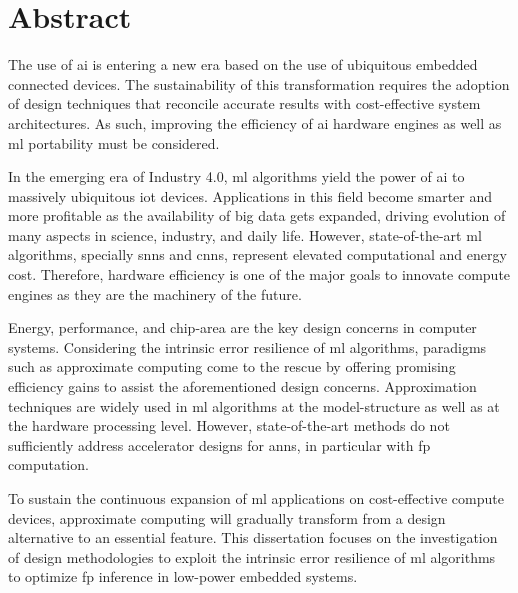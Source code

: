 \chapter*{Abstract}
\thispagestyle{empty}
The use of \gls{ai} is entering a new era based on the use of ubiquitous embedded connected devices. The sustainability of this transformation requires the adoption of design techniques that reconcile accurate results with cost-effective system architectures. As such, improving the efficiency of \gls{ai} hardware engines as well as \gls{ml} portability must be considered.

In the emerging era of Industry 4.0, \gls{ml} algorithms yield the power of \gls{ai} to massively ubiquitous \gls{iot} devices. Applications in this field become smarter and more profitable as the availability of big data gets expanded, driving evolution of many aspects in science, industry, and daily life. However, state-of-the-art \gls{ml} algorithms, specially \glspl{snn} and \glspl{cnn}, represent elevated computational and energy cost. Therefore, hardware efficiency is one of the major goals to innovate compute engines as they are the machinery of the future.

Energy, performance, and chip-area are the key design concerns in computer systems. Considering the intrinsic error resilience of \gls{ml} algorithms, paradigms such as approximate computing come to the rescue by offering promising efficiency gains to assist the aforementioned design concerns. Approximation techniques are widely used in \gls{ml} algorithms at the model-structure as well as at the hardware processing level. However, state-of-the-art methods do not sufficiently address accelerator designs for \glspl{ann}, in particular with \gls{fp} computation.

To sustain the continuous expansion of \gls{ml} applications on cost-effective compute devices, approximate computing will gradually transform from a design alternative to an essential feature. This dissertation focuses on the investigation of design methodologies to exploit the intrinsic error resilience of \gls{ml} algorithms to optimize \gls{fp} inference in low-power embedded systems.

